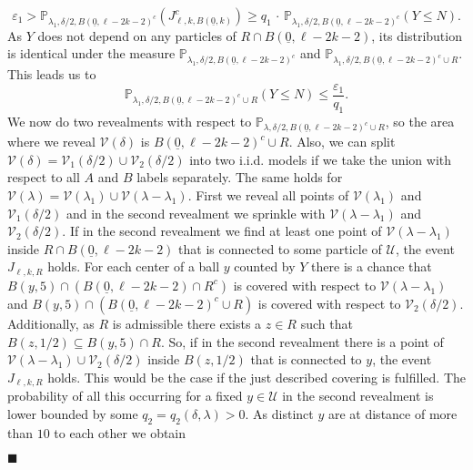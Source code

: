 \documentclass[11pt]{article}%
\newenvironment{proof}{\vspace{1ex}\noindent{\bf Proof.}}{\hspace*{\fill}$\blacksquare$\vspace{1ex}}
\newcommand{\eps}{\varepsilon}
\newcommand{\Pro}{\mathbb{P}}
\newcommand{\typ}{\underline{0}}
\begin{document}
\begin{proof}
\begin{equation*}
	\eps_1>\Pro_{\lambda_1,\delta/2,B(\typ,\ell-2k-2)^c}(J_{\ell,k,B(\typ,k)}^c)\geq q_1\,\cdot\, \Pro_{\lambda_1,\delta/2,B(\typ,\ell-2k-2)^c}(Y\leq N).
\end{equation*}
 As $ Y $ does not depend on any particles of $ R\cap B(\typ,\ell-2k-2) $, its distribution is identical under the measure $ \Pro_{\lambda_1,\delta/2,B(\typ,\ell-2k-2)^c}  $ and $ \Pro_{\lambda_1,\delta/2,B(\typ,\ell-2k-2)^c\cup R} $. This leads us to
\begin{equation*}
	\Pro_{\lambda_1,\delta/2,B(\typ,\ell-2k-2)^c\cup R}(Y\leq N)\leq \frac{\eps_1}{q_1}.
\end{equation*}
We now do two revealments with respect to $ \Pro_{\lambda,\delta/2,B(\typ,\ell-2k-2)^c\cup R} $, so the area where we reveal $ \mathcal{V}(\delta) $ is $ B(\typ,\ell-2k-2)^c\cup R $. Also, we can split $ \mathcal{V}(\delta)=\mathcal{V}_1(\delta/2)\cup\mathcal{V}_2(\delta/2) $ into two i.i.d. models if we take the union with respect to all $A$ and $B$ labels separately. The same holds for $ \mathcal{V}(\lambda)=\mathcal{V}(\lambda_1)\cup\mathcal{V}(\lambda-\lambda_1)$.
First we reveal all points of $\mathcal{V}(\lambda_1)$ and $\mathcal{V}_1(\delta/2)$ and in the second revealment we sprinkle with $ \mathcal{V}(\lambda-\lambda_{1})$ and $\mathcal{V}_2(\delta/2)$. If in the second revealment we find at least one point of $ \mathcal{V}(\lambda-\lambda_{1}) $ inside $ R\cap B(\typ,\ell-2k-2) $ that is connected to some particle of $ \mathcal{U} $, the event $  J_{\ell,k,R} $ holds. For each center of a ball $ y $ counted by $ Y $ there is a chance that $ B(y,5)\cap (B(\typ,\ell-2k-2)\cap R^c) $ is covered with respect to $ \mathcal{V}(\lambda-\lambda_1) $ and $ B(y,5)\cap (B(\typ,\ell-2k-2)^c\cup R) $ is covered with respect to $ \mathcal{V}_2(\delta/2) $. Additionally, as $ R $ is admissible there exists a $ z\in R $ such that $ B(z,1/2)\subseteq B(y,5)\cap R $. So, if in the second revealment there is a point of $ \mathcal{V}(\lambda-\lambda_1)\cup\mathcal{V}_2(\delta/2) $ inside $ B(z,1/2) $ that is connected to $ y $, the event $ J_{\ell,k,R} $ holds. This would be the case if the just described covering is fulfilled. The probability of all this occurring for a fixed $ y\in \mathcal{U} $ in the second revealment is lower bounded by some $ q_2=q_2(\delta,\lambda)>0 $. As distinct $ y $ are at distance of more than $ 10 $ to each other we obtain
\begin{equation*}
	\begin{split}

\end{split}
\end{equation*}
\end{proof}
\end{document}
